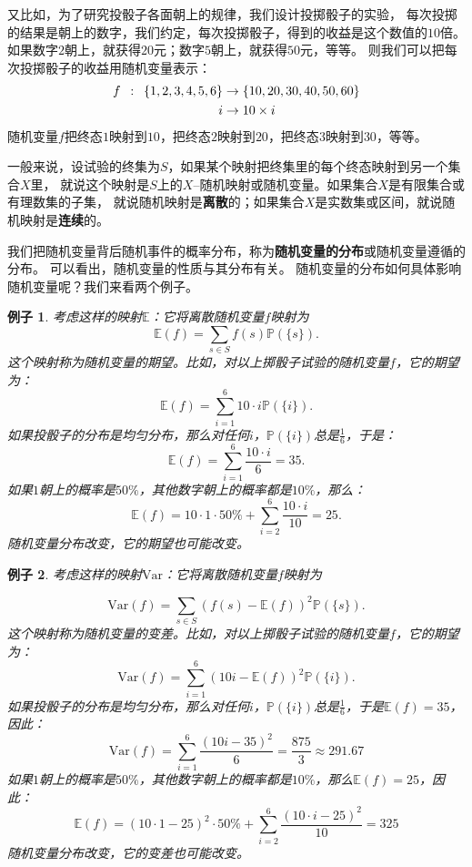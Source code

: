 \documentclass[12pt,UTF8]{ctexbook}
\newtheorem{ex}{例子}[section]
\begin{document}
又比如，为了研究投骰子各面朝上的规律，我们设计投掷骰子的实验，
每次投掷的结果是朝上的数字，我们约定，每次投掷骰子，得到的收益是这个数值的$10$倍。
如果数字$2$朝上，就获得$20$元；数字$5$朝上，就获得$50$元，等等。
则我们可以把每次投掷骰子的收益用随机变量表示：
\begin{align}
f \,\,\, : \,\,\, \{1,2,3,4,5,6\} &\rightarrow \{10,20,30,40,50,60\} \notag \\
 i &\rightarrow 10\times i \notag 
\end{align}
随机变量$f$把终态$1$映射到$10$，把终态$2$映射到$20$，把终态$3$映射到$30$，等等。

一般来说，设试验的终集为$S$，如果某个映射把终集里的每个终态映射到另一个集合$X$里，
就说这个映射是$S$上的$X$–随机映射或随机变量。如果集合$X$是有限集合或有理数集的子集，
就说随机映射是\textbf{离散}的；如果集合$X$是实数集或区间，就说随机映射是\textbf{连续}的。

我们把随机变量背后随机事件的概率分布，称为\textbf{随机变量的分布}或随机变量遵循的分布。
可以看出，随机变量的性质与其分布有关。
随机变量的分布如何具体影响随机变量呢？我们来看两个例子。
\begin{ex}
    考虑这样的映射$\mathbb{E}$：它将离散随机变量$f$映射为
    $$ \mathbb{E}(f) = \sum_{s\in S} f(s) \mathbb{P}(\{s\}).$$
    这个映射称为随机变量的期望。比如，对以上掷骰子试验的随机变量$f$，它的期望为：
    $$ \mathbb{E}(f) = \sum_{i=1}^6 10\cdot i \mathbb{P}(\{i\}).$$
    如果投骰子的分布是均匀分布，那么对任何$i$​，$\mathbb{P}(\{i\})$​总是$\frac{1}{6}$​，于是：
    $$ \mathbb{E}(f) = \sum_{i=1}^6 \frac{10\cdot i}{6} = 35. $$
    如果$1$朝上的概率是$50\%$，其他数字朝上的概率都是$10\%$​，那么：
    $$ \mathbb{E}(f) = 10\cdot 1\cdot 50\% + \sum_{i=2}^6 \frac{10\cdot i}{10} = 25. $$
    随机变量分布改变，它的期望也可能改变。
\end{ex}
\begin{ex}
    考虑这样的映射$\mathrm{Var}$：它将离散随机变量$f$映射为

    $$ \mathrm{Var}(f) = \sum_{s\in S} \left(f(s) - \mathbb{E}(f)\right)^2 \mathbb{P}(\{s\}).$$
    这个映射称为随机变量的变差。比如，对以上掷骰子试验的随机变量$f$，它的期望为：
    $$ \mathrm{Var}(f) = \sum_{i=1}^6 \left(10i - \mathbb{E}(f)\right)^2 \mathbb{P}(\{i\}).$$
    如果投骰子的分布是均匀分布，那么对任何$i$，$\mathbb{P}(\{i\})$总是$\frac{1}{6}$，于是$\mathbb{E}(f) = 35$，因此：
    $$\mathrm{Var}(f) = \sum_{i=1}^6 \frac{\left(10i - 35\right)^2}{6} = \frac{875}{3} \approx 291.67$$    
    如果$1$朝上的概率是$50\%$，其他数字朝上的概率都是$10\%$，那么$\mathbb{E}(f) = 25$，因此：    
    $$ \mathbb{E}(f) = (10\cdot 1 - 25)^2\cdot 50\% + \sum_{i=2}^6 \frac{(10\cdot i - 25)^2}{10} = 325 $$
    随机变量分布改变，它的变差也可能改变。
\end{ex}
\end{document}
